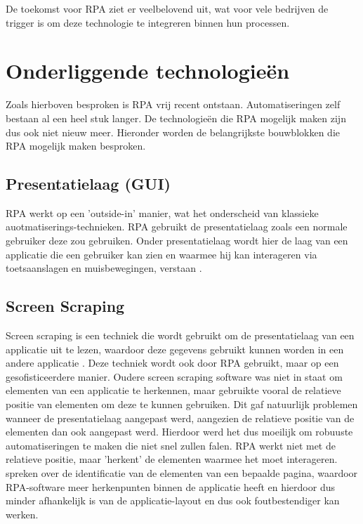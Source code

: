 De toekomst voor RPA ziet er veelbelovend uit, wat voor vele bedrijven de trigger is om deze technologie te integreren binnen hun processen.

\section{Onderliggende technologieën}
\label{sec:onderliggende-technologieën}

Zoals hierboven besproken is RPA vrij recent ontstaan. Automatiseringen zelf bestaan al een heel stuk langer. De technologieën die RPA mogelijk maken zijn dus ook niet nieuw meer. Hieronder worden de belangrijkste bouwblokken die RPA mogelijk maken besproken.

\subsection{Presentatielaag (GUI)}
\label{subsec:presentatielaag}

RPA werkt op een 'outside-in' manier, wat het onderscheid van klassieke auotmatiserings-technieken. RPA gebruikt de presentatielaag zoals een normale gebruiker deze zou gebruiken. Onder presentatielaag wordt hier de laag van een applicatie die een gebruiker kan zien en waarmee hij kan interageren via toetsaanslagen en muisbewegingen, verstaan \autocite{ZalewskaTurzynska2022}.

\subsection{Screen Scraping}
\label{subsec:screen-scraping}

Screen scraping is een techniek die wordt gebruikt om de presentatielaag van een applicatie uit te lezen, waardoor deze gegevens gebruikt kunnen worden in een andere applicatie \autocite{Spencer2018}. Deze techniek wordt ook door RPA gebruikt, maar op een gesofisticeerdere manier. Oudere screen scraping software was niet in staat om elementen van een applicatie te herkennen, maar gebruikte vooral de relatieve positie van elementen om deze te kunnen gebruiken. 
Dit gaf natuurlijk problemen wanneer de presentatielaag aangepast werd, aangezien de relatieve positie van de elementen dan ook aangepast werd. Hierdoor werd het dus moeilijk om robuuste automatiseringen te maken die niet snel zullen falen. RPA werkt niet met de relatieve positie, maar 'herkent' de elementen waarmee het moet interageren. \textcite{Asquith2019} spreken over de identificatie van de elementen van een bepaalde pagina, waardoor RPA-software meer herkenpunten binnen de applicatie heeft en hierdoor dus minder afhankelijk is van de applicatie-layout en dus ook foutbestendiger kan werken.

